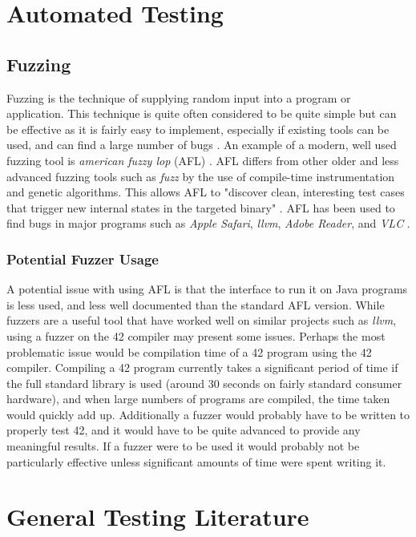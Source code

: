 \section{Automated Testing}
\subsection{Fuzzing}
Fuzzing is the technique of supplying random input into a program or application. This technique is quite often considered to be quite simple \cite{Miller:1995} but can be effective as it is fairly easy to implement, especially if existing tools can be used, and can find a large number of bugs\cite{Miller:1990} \cite{Miller:1995} \cite{Miller:2000} \cite{arnabold}. An example of a modern, well used fuzzing tool is \textit{american fuzzy lop} (AFL) \cite{afl}. AFL differs from other older and less advanced fuzzing tools such as \textit{fuzz} \cite{Miller:1990} by the use of compile-time instrumentation and genetic algorithms. This allows AFL to "discover clean, interesting test cases that trigger new internal states in the targeted binary" \cite{afl}. AFL has been used to find bugs in major programs such as \textit{Apple Safari}, \textit{llvm}, \textit{Adobe Reader}, and \textit{VLC} \cite{afl}.

\subsubsection{Potential Fuzzer Usage}
A potential issue with using AFL is that the interface to run it on Java programs \cite{javaAfl} is less used, and less well documented than the standard AFL version.
While fuzzers are a useful tool that have worked well on similar projects such as \textit{llvm}, using a fuzzer on the 42 compiler may present some issues. Perhaps the most problematic issue would be compilation time of a 42 program using the 42 compiler. Compiling a 42 program currently takes a significant period of time if the full standard library is used (around 30 seconds on fairly standard consumer hardware), and when large numbers of programs are compiled, the time taken would quickly add up. Additionally a fuzzer would probably have to be written to properly test 42, and it would have to be quite advanced to provide any meaningful results. If a fuzzer were to be used it would probably not be particularly effective unless significant amounts of time were spent writing it.

\section{General Testing Literature}
